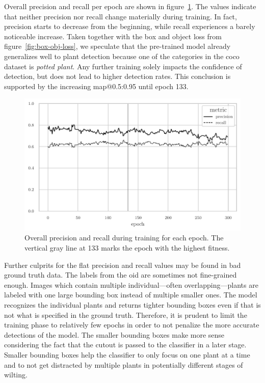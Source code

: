 \documentclass[draft,final]{vutinfth} %
\begin{document}
Overall precision and recall per epoch are shown in
figure~\ref{fig:prec-rec}. The values indicate that neither precision
nor recall change materially during training. In fact, precision
starts to decrease from the beginning, while recall experiences a
barely noticeable increase. Taken together with the box and object
loss from figure~\ref{fig:box-obj-loss}, we speculate that the
pre-trained model already generalizes well to plant detection because
one of the categories in the \gls{coco} \cite{lin2015} dataset is
\emph{potted plant}. Any further training solely impacts the
confidence of detection, but does not lead to higher detection
rates. This conclusion is supported by the increasing
\gls{map}@0.5:0.95 until epoch \num{133}.

\begin{figure}
  \centering
  \includegraphics{graphics/precision_recall.pdf}
  \caption[Object detection precision and recall during
  training.]{Overall precision and recall during training for each
    epoch. The vertical gray line at 133 marks the epoch with the
    highest fitness.}
  \label{fig:prec-rec}
\end{figure}

Further culprits for the flat precision and recall values may be found
in bad ground truth data. The labels from the \gls{oid} are sometimes not
fine-grained enough. Images which contain multiple individual—often
overlapping—plants are labeled with one large bounding box instead of
multiple smaller ones. The model recognizes the individual plants and
returns tighter bounding boxes even if that is not what is specified
in the ground truth. Therefore, it is prudent to limit the training
phase to relatively few epochs in order to not penalize the more
accurate detections of the model. The smaller bounding boxes make more
sense considering the fact that the cutout is passed to the classifier
in a later stage. Smaller bounding boxes help the classifier to only
focus on one plant at a time and to not get distracted by multiple
plants in potentially different stages of wilting.
\end{document}
